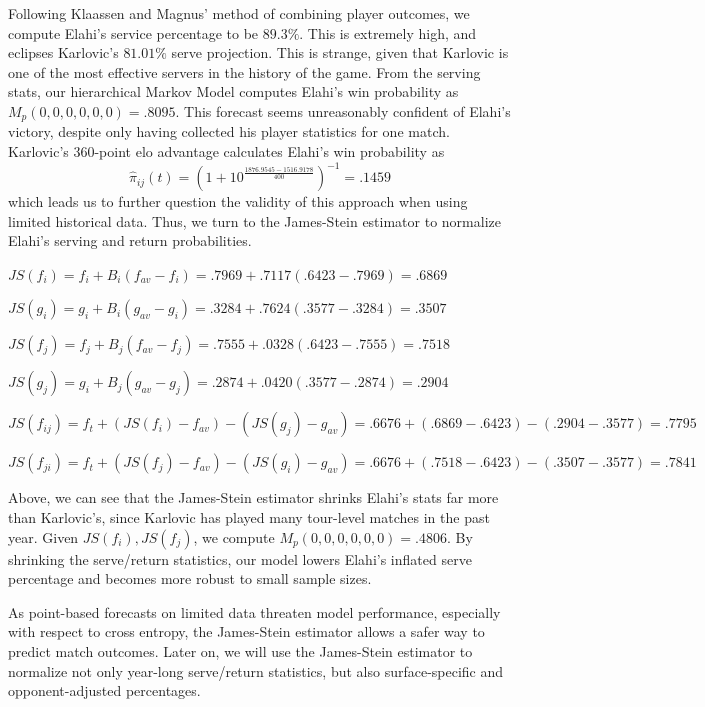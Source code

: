 \documentclass[chapterprefix=false]{report}
\begin{document}
Following Klaassen and Magnus' method of combining player outcomes, we compute Elahi's service percentage to be $89.3\%$. This is extremely high, and eclipses Karlovic's $81.01\%$ serve projection. This is strange, given that Karlovic is one of the most effective servers in the history of the game. From the serving stats, our hierarchical Markov Model computes Elahi's win probability as $M_p(0,0,0,0,0,0) = .8095$. This forecast seems unreasonably confident of Elahi's victory, despite only having collected his player statistics for one match. Karlovic's 360-point elo advantage calculates Elahi's win probability as $$\hat{\pi}_{ij}(t) = (1+10^\frac{1876.9545 - 1516.9178}{400})^{-1} = .1459$$ which leads us to further question the validity of this approach when using limited historical data. Thus, we turn to the James-Stein estimator to normalize Elahi's serving and return probabilities.

\begin{center}
$JS(f_i) = f_i + B_i(f_{av}-f_i) = .7969 + .7117(.6423-.7969) = .6869$

$JS(g_i) = g_i + B_i(g_{av}-g_i) = .3284 + .7624(.3577-.3284) = .3507$

$JS(f_j) = f_j + B_j(f_{av}-f_j) = .7555 + .0328(.6423-.7555) = .7518$

$JS(g_j) = g_i + B_j(g_{av}-g_j) = .2874 + .0420(.3577-.2874) = .2904$

$JS(f_{ij}) = f_t + (JS(f_i)-f_{av})-(JS(g_j)-g_{av}) = .6676 + (.6869-.6423) - (.2904-.3577) = .7795$

$JS(f_{ji}) = f_t + (JS(f_j)-f_{av})-(JS(g_i)-g_{av}) = .6676 + (.7518-.6423) - (.3507-.3577) = .7841$

\end{center}

Above, we can see that the James-Stein estimator shrinks Elahi's stats far more than Karlovic's, since Karlovic has played many tour-level matches in the past year. Given $JS(f_i),JS(f_j)$, we compute $M_p(0,0,0,0,0,0) = .4806$. By shrinking the serve/return statistics, our model lowers Elahi's inflated serve percentage and becomes more robust to small sample sizes.

As point-based forecasts on limited data threaten model performance, especially with respect to cross entropy, the James-Stein estimator allows a safer way to predict match outcomes. Later on, we will use the James-Stein estimator to normalize not only year-long serve/return statistics, but also surface-specific and opponent-adjusted percentages.
\end{document}
